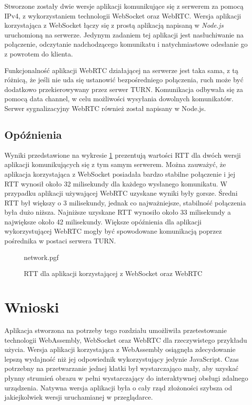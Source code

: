 \documentclass[language=polish,type=master]{aghmodern}
\begin{document}
Stworzone zostały dwie wersje aplikacji komunikujące się z serwerem za pomocą IPv4, z wykorzystaniem technologii WebSocket oraz WebRTC.
Wersja aplikacji korzystająca z WebSocket łączy się z prostą aplikacją napisaną w \emph{Node.js}\footnotemark{} uruchomioną na serwerze.
Jedynym zadaniem tej aplikacji jest nasłuchiwanie na połączenie, odczytanie nadchodzącego komunikatu i natychmiastowe odesłanie go z powrotem do klienta.

Funkcjonalność aplikacji WebRTC działającej na serwerze jest taka sama, z tą różnicą, że jeśli nie uda się ustanowić bezpośredniego połączenia, ruch może być dodatkowo przekierowywany przez serwer TURN.
Komunikacja odbywała się za pomocą data channel, w celu możliwości wysyłania dowolnych komunikatów.
Serwer sygnalizacyjny WebRTC również został napisany w Node.js.

\subsection{Opóźnienia}
Wyniki przedstawione na wykresie \ref{fig:network} prezentują wartości RTT dla dwóch wersji aplikacji komunikujących się z tym samym serwerem.
Można zauważyć, że aplikacja korzystająca z WebSocket posiadała bardzo stabilne połączenie i jej RTT wynosił około 32 milisekundy dla każdego wysłanego komunikatu.
W przypadku aplikacji używającej WebRTC uzyskane wyniki były gorsze.
Średni RTT był większy o 3 milisekundy, jednak co najważniejsze, stabilność połączenia była dużo niższa.
Najniższe uzyskane RTT wynosiło około 33 milisekundy a największe około 42 milisekundy.
Większe opóźnienia dla aplikacji wykorzystującej WebRTC mogły być spowodowane komunikacją poprzez pośrednika w postaci serwera TURN.

\begin{figure}[H]
    \centering
    {network.pgf}
    \vspace*{5pt}
    \caption{RTT dla aplikacji korzystającej z WebSocket oraz WebRTC}
    \label{fig:network}
\end{figure}

\section{Wnioski}
Aplikacja stworzona na potrzeby tego rozdziału umożliwiła przetestowanie technologii WebAssembly, WebSocket oraz WebRTC dla rzeczywistego przykładu użycia.
Wersja aplikacji korzystająca z WebAssembly osiągnęła zdecydowanie lepszą wydajność niż jej odpowiednik wykorzystujący jedynie JavaScript.
Czas potrzebny na przetwarzanie jednej klatki był wystarczająco mały, aby uzyskać płynny strumień obrazu w pełni wystarczający do interaktywnej obsługi zdalnego urządzenia.
Natywna wersja aplikacji była o cały rząd złożoności szybsza od jakiejkolwiek wersji uruchamianej w przeglądarce.
\end{document}

